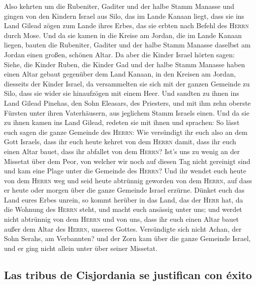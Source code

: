  Also kehrten um die Rubeniter, Gaditer und der halbe
Stamm Manasse und gingen von den Kindern Israel aus Silo, das im Lande
Kanaan liegt, dass sie ins Land Gilead zögen zum Lande ihres Erbes, das
sie erbten nach Befehl des \textsc{Herrn} durch Mose. 
Und da sie kamen in die Kreise am Jordan, die im Lande Kanaan liegen,
bauten die Rubeniter, Gaditer und der halbe Stamm Manasse daselbst am
Jordan einen großen, schönen Altar.  Da aber die Kinder
Israel hörten sagen: Siehe, die Kinder Ruben, die Kinder Gad und der
halbe Stamm Manasse haben einen Altar gebaut gegenüber dem Land Kanaan,
in den Kreisen am Jordan, diesseits der Kinder Israel, 
da versammelten sie sich mit der ganzen Gemeinde zu Silo, dass sie wider
sie hinaufzögen mit einem Heer.  Und sandten zu ihnen ins
Land Gilead Pinehas, den Sohn Eleasars, des Priesters, 
und mit ihm zehn oberste Fürsten unter ihren Vaterhäusern, aus jeglichem
Stamm Israels einen.  Und da sie zu ihnen kamen ins Land
Gilead, redeten sie mit ihnen und sprachen:  So lässt
euch sagen die ganze Gemeinde des \textsc{Herrn}: Wie versündigt ihr
euch also an dem Gott Israels, dass ihr euch heute kehret von dem
\textsc{Herrn} damit, dass ihr euch einen Altar bauet, dass ihr abfallet
von dem \textsc{Herrn}?  Ist's uns zu wenig an der
Missetat über dem Peor, von welcher wir noch auf diesen Tag nicht
gereinigt sind und kam eine Plage unter die Gemeinde des \textsc{Herrn}?
 Und ihr wendet euch heute von dem \textsc{Herrn} weg und
seid heute abtrünnig geworden von dem \textsc{Herrn}, auf dass er heute
oder morgen über die ganze Gemeinde Israel erzürne. 
Dünket euch das Land eures Erbes unrein, so kommt herüber in das Land,
das der \textsc{Herr} hat, da die Wohnung des \textsc{Herrn} steht, und
macht euch ansässig unter uns; und werdet nicht abtrünnig von dem
\textsc{Herrn} und von uns, dass ihr euch einen Altar bauet außer dem
Altar des \textsc{Herrn}, unseres Gottes.  Versündigte
sich nicht Achan, der Sohn Serahs, am Verbannten? und der Zorn kam über
die ganze Gemeinde Israel, und er ging nicht allein unter über seiner
Missetat.

\hypertarget{las-tribus-de-cisjordania-se-justifican-con-uxe9xito}{%
\subsection{Las tribus de Cisjordania se justifican con
éxito}\label{las-tribus-de-cisjordania-se-justifican-con-uxe9xito}}

